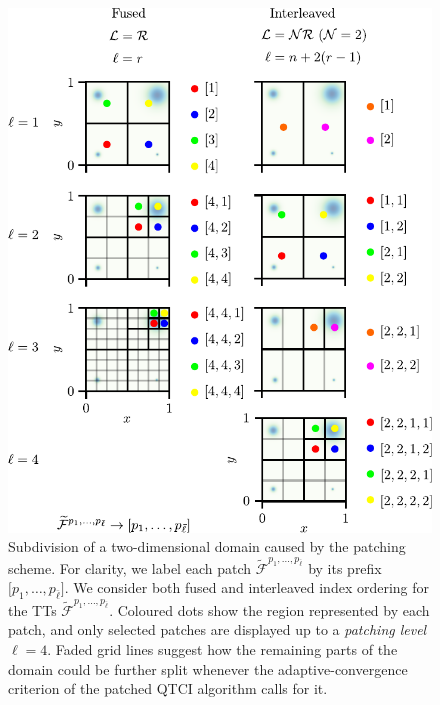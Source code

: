 \begin{figure}[ht!]
	\includegraphics{figures/PatchDivision.pdf}
	\caption{Subdivision of a two-dimensional domain caused by the patching scheme. For clarity, we label each patch $\widetilde{\mathcal F}^{p_1,\dots,p_{\bar\ell}}$ by its prefix $\bigl[p_1,\dots,p_{\bar\ell}\bigr]$. We consider both fused and interleaved index ordering for the TTs $\widetilde{\mathcal F}^{p_1,\dots,p_{\bar\ell}}$. Coloured dots show the region represented by each patch, and only selected patches are displayed up to a \textit{patching level} $\ell=4$. Faded grid lines suggest how the remaining parts of the domain could be further split whenever the adaptive-convergence criterion of the patched QTCI algorithm calls for it.}
	\label{fig:patchSubdivision}
\end{figure}

